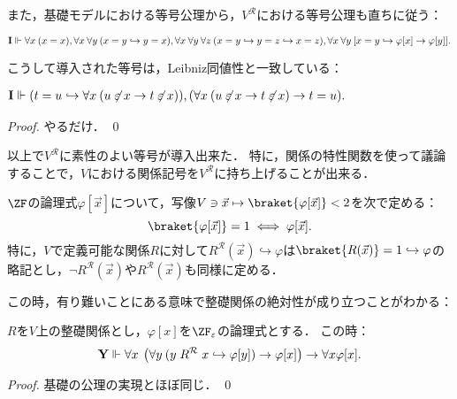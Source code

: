 \documentclass[realisability.tex]{subfiles}
\begin{document}
また，基礎モデルにおける等号公理から，$V^{\mathcal{R}}$における等号公理も直ちに従う：

\begin{lemma}
 \[
  \mathsf{\mathbf{I}} \Vdash \forall x \: (x = x),
            \forall x \: \forall y\: (x = y \hookrightarrow y = x),
            \forall x \: \forall y\: \forall z \: (x = y \hookrightarrow y = z \hookrightarrow x = z),
            \forall x \: \forall y\:
                [x = y \hookrightarrow \varphi[x] \to \varphi[y]].
 \]
\end{lemma}

こうして導入された等号は，Leibniz同値性と一致している：

\begin{lemma}
 $\begin{aligned}
   \mathsf{\mathbf{I}} \Vdash (t = u \hookrightarrow \forall x\: (u \not\mathrel{\varepsilon} x \to t \not\mathrel{\varepsilon} x)),
            (\forall x \:(u \not\mathrel{\varepsilon} x \to t \not\mathrel{\varepsilon} x) \to t = u ).
 \end{aligned}$
\end{lemma}
\begin{proof}
 やるだけ． \qed
\end{proof}

以上で$V^{\mathcal{R}}$に素性のよい等号が導入出来た．
特に，関係の特性関数を使って議論することで，$V$における関係記号を$V^{\mathcal{R}}$に持ち上げることが出来る．

\begin{definition}
 $\ZF$の論理式$\varphi[\vec{x}]$について，写像$V \ni \vec{x} \mapsto \braket{\varphi[\vec{x}]} < 2$を次で定める：
 \[
  \braket{ \varphi[\vec{x}] } = 1 \iff \varphi[\vec{x}].
 \]
 特に，$V$で定義可能な関係$R$に対して$R^{\mathcal{R}}(\vec{x})\hookrightarrow \varphi$は$\braket{R(\vec{x})} = 1 \hookrightarrow \varphi$の略記とし，$\neg R^{\mathcal{R}}(\vec{x})$や$R^{\mathcal{R}}(\vec{x})$も同様に定める．
\end{definition}

この時，有り難いことにある意味で整礎関係の絶対性が成り立つことがわかる：

\begin{lemma}\label{lem:wf-pres}
 $R$を$V$上の整礎関係とし，$\varphi[x]$を$\ZF_{\varepsilon}$の論理式とする．
 この時：
 \[
  \mathsf{\mathbf{Y}} \Vdash \forall x\: \left(\forall y\: (y \mathrel{R^{\mathcal{R}}} x \hookrightarrow \varphi[y]) \to \varphi[x] \right) \to \forall x \varphi[x].
 \]
\end{lemma}
\begin{proof}
 基礎の公理の実現とほぼ同じ． \qed
\end{proof}
\end{document}
